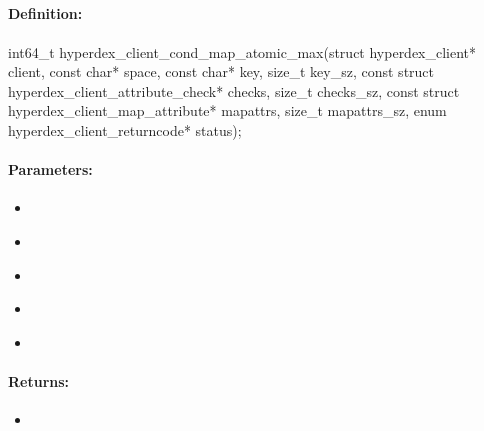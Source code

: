 \pagebreak
\subsection{}
\label{api:c:cond_map_atomic_max}


\paragraph{Definition:}
\begin{ccode}
int64_t hyperdex_client_cond_map_atomic_max(struct hyperdex_client* client,
        const char* space,
        const char* key, size_t key_sz,
        const struct hyperdex_client_attribute_check* checks, size_t checks_sz,
        const struct hyperdex_client_map_attribute* mapattrs, size_t mapattrs_sz,
        enum hyperdex_client_returncode* status);
\end{ccode}

\paragraph{Parameters:}
\begin{itemize}[noitemsep]
\item {}\\

\item {}\\

\item {}\\

\item {}\\

\item {}\\

\end{itemize}

\paragraph{Returns:}
\begin{itemize}[noitemsep]
\item {}\\

\end{itemize}

